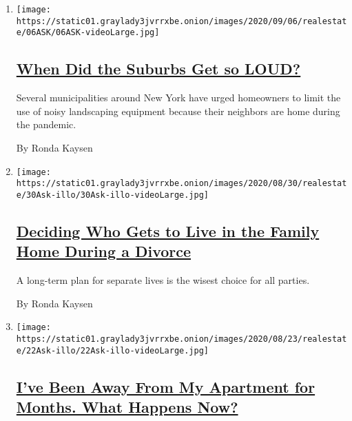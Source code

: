 \begin{enumerate}
\def\labelenumi{\arabic{enumi}.}
\item
  \texttt{[image: https://static01.graylady3jvrrxbe.onion/images/2020/09/06/realestate/06ASK/06ASK-videoLarge.jpg]}

  \hypertarget{when-did-the-suburbs-get-so-loud}{%
  \subsection{\texorpdfstring{\href{/2020/09/05/realestate/noise-suburbs-leaf-blower-.html}{When
  Did the Suburbs Get so
  LOUD?}}{When Did the Suburbs Get so LOUD?}}\label{when-did-the-suburbs-get-so-loud}}

  Several municipalities around New York have urged homeowners to limit
  the use of noisy landscaping equipment because their neighbors are
  home during the pandemic.

  By Ronda Kaysen
\item
  \texttt{[image: https://static01.graylady3jvrrxbe.onion/images/2020/08/30/realestate/30Ask-illo/30Ask-illo-videoLarge.jpg]}

  \hypertarget{deciding-who-gets-to-live-in-the-family-home-during-a-divorce}{%
  \subsection{\texorpdfstring{\href{/2020/08/29/realestate/divorce-keeping-the-house.html}{Deciding
  Who Gets to Live in the Family Home During a
  Divorce}}{Deciding Who Gets to Live in the Family Home During a Divorce}}\label{deciding-who-gets-to-live-in-the-family-home-during-a-divorce}}

  A long-term plan for separate lives is the wisest choice for all
  parties.

  By Ronda Kaysen
\item
  \texttt{[image: https://static01.graylady3jvrrxbe.onion/images/2020/08/23/realestate/22Ask-illo/22Ask-illo-videoLarge.jpg]}

  \hypertarget{ive-been-away-from-my-apartment-for-months-what-happens-now}{%
  \subsection{\texorpdfstring{\href{/2020/08/22/realestate/covid-rental-apartment.html}{I've
  Been Away From My Apartment for Months. What Happens
  Now?}}{I've Been Away From My Apartment for Months. What Happens Now?}}\label{ive-been-away-from-my-apartment-for-months-what-happens-now}}


\end{enumerate}

